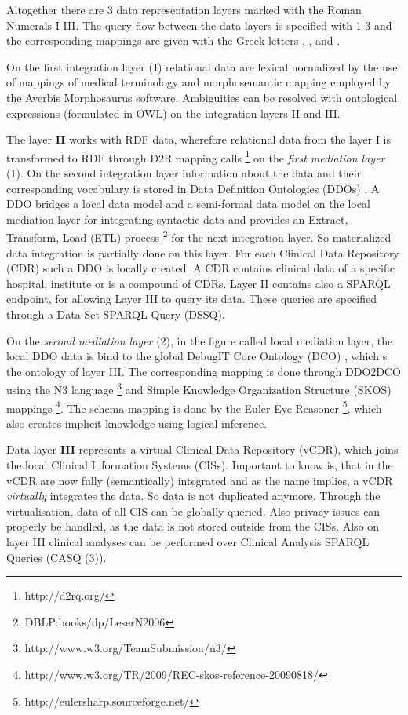 Altogether there are 3 data representation layers marked with the Roman Numerals I-III. The query flow between the data layers is specified with 1-3 and the corresponding mappings are given with the Greek letters \textalpha , \textbeta,  and \textgamma .

On the first integration layer (\textbf{I}) relational data are lexical normalized by the use of mappings of medical terminology and morphosemantic mapping employed by the Averbis Morphosaurus software\cite{DaumkeDiss}. Ambiguities can be resolved with ontological expressions (formulated in OWL) on the integration layers II and III. 

The layer \textbf{II} works with RDF data, wherefore relational data from the layer I is transformed to RDF through D2R mapping calls \footnote{http://d2rq.org/} on the\emph{ first mediation layer} (1). On the second integration layer information about the data and their corresponding vocabulary is stored in Data Definition Ontologies (DDOs) \cite{DebugITDDO}. A DDO bridges a local data model and a semi-formal data model on the local mediation layer for integrating syntactic data and provides an Extract, Transform, Load (ETL)-process \footnote{DBLP:books/dp/LeserN2006} for the next integration layer. So materialized data integration is partially done on this layer.
For each Clinical Data Repository (CDR) such a DDO is locally created. A CDR contains clinical data of a specific hospital, institute or is a compound of CDRs.
Layer II contains also a SPARQL endpoint, for allowing Layer III to query its data. These queries are specified through a Data Set SPARQL Query (DSSQ). 

On the \emph{second mediation layer} (2), in the figure called local mediation layer, the local DDO data is bind to the global DebugIT Core Ontology (DCO) \cite{Schober_developingdco:}, which s the ontology of layer III. The corresponding mapping is done through DDO2DCO using the N3 language \footnote{http://www.w3.org/TeamSubmission/n3/} and Simple Knowledge Organization Structure (SKOS) mappings \footnote{http://www.w3.org/TR/2009/REC-skos-reference-20090818/}. The schema mapping is done by the Euler Eye Reasoner \footnote{http://eulersharp.sourceforge.net/}, which also creates implicit knowledge using logical inference.

Data layer \textbf{III} represents a virtual Clinical Data Repository (vCDR), which joins the local Clinical Information Systems (CISs). Important to know is, that in the vCDR are now fully (semantically) integrated and as the name implies, a vCDR \emph{virtually} integrates the data. So data is not duplicated anymore. Through the virtualisation, data of all CIS can be globally queried. Also privacy issues can properly be handled, as the data is not stored outside from the CISs.
Also on layer III clinical analyses can be performed over Clinical Analysis SPARQL Queries (CASQ (3)). 

